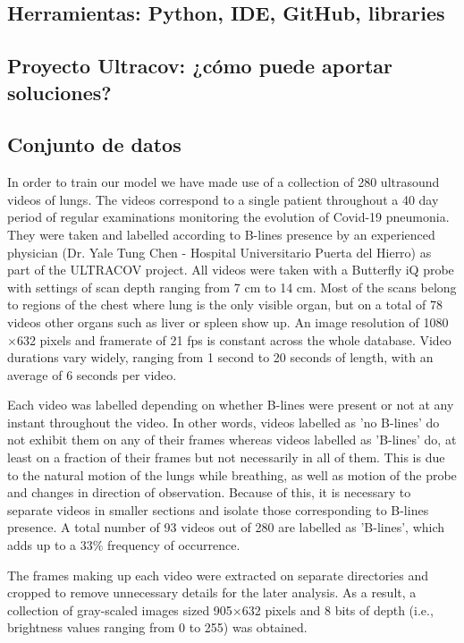 \documentclass[11pt]{article} %
\begin{document}
\subsection{Herramientas: Python, IDE, GitHub, libraries}

\subsection{Proyecto Ultracov: ¿cómo puede aportar soluciones?}

\subsection{Conjunto de datos}

	In order to train our model we have made use of a collection of 280 ultrasound videos of lungs. The videos correspond to a single patient throughout a 40 day period of regular examinations monitoring the evolution of Covid-19 pneumonia. They were taken and labelled according to B-lines presence by an experienced physician (Dr. Yale Tung Chen - Hospital Universitario Puerta del Hierro) as part of the ULTRACOV project. All videos were taken with a Butterfly iQ probe with settings of scan depth ranging from 7 cm to 14 cm. Most of the scans belong to regions of the chest where lung is the only visible organ, but on a total of 78 videos other organs such as liver or spleen show up. An image resolution of 1080$\times$632 pixels and framerate of 21 fps is constant across the whole database. Video durations vary widely, ranging from 1 second to 20 seconds of length, with an average of 6 seconds per video. 
	
	Each video was labelled depending on whether B-lines were present or not at any instant throughout the video. In other words, videos labelled as 'no B-lines' do not exhibit them on any of their frames whereas videos labelled as 'B-lines' do, at least on a fraction of their frames but not necessarily in all of them. This is due to the natural motion of the lungs while breathing, as well as motion of the probe and changes in direction of observation. Because of this, it is necessary to  separate videos in smaller sections and isolate those corresponding to B-lines presence. A total number of 93 videos out of 280 are labelled as 'B-lines', which adds up to a $33 \%$ frequency of occurrence. 
	
	The frames making up each video were extracted on separate directories and cropped to remove unnecessary details for the later analysis. As a result, a collection of gray-scaled images sized 905$\times$632 pixels and 8 bits of depth (i.e., brightness values ranging from 0 to 255) was obtained.
	
\end{document}
